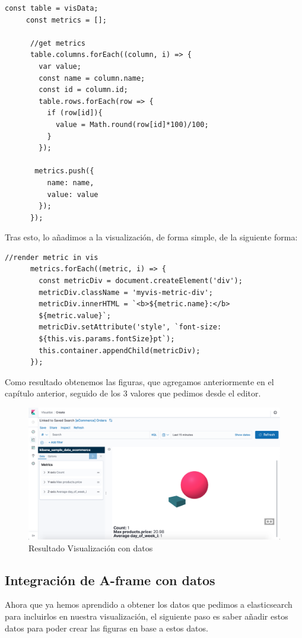 \documentclass[a4paper, 12pt]{book}
\begin{document}
\begin{lstlisting}[frame=single]
     const table = visData;
     const metrics = [];

      //get metrics
      table.columns.forEach((column, i) => {
        var value;
        const name = column.name;
        const id = column.id;
        table.rows.forEach(row => {
          if (row[id]){
            value = Math.round(row[id]*100)/100;
          }
        });

       metrics.push({
          name: name,
          value: value
        });
      });
\end{lstlisting}
Tras esto, lo añadimos a la visualización, de forma simple, de la siguiente forma:
\begin{lstlisting}[frame=single]
      //render metric in vis
      metrics.forEach((metric, i) => {
        const metricDiv = document.createElement('div');
        metricDiv.className = 'myvis-metric-div';
        metricDiv.innerHTML = `<b>${metric.name}:</b> 
        ${metric.value}`;
        metricDiv.setAttribute('style', `font-size: 
        ${this.vis.params.fontSize}pt`);
        this.container.appendChild(metricDiv);
      });
\end{lstlisting}
Como resultado obtenemos las figuras, que agregamos anteriormente en el capítulo anterior, seguido de los 3 valores que pedimos desde el editor.
\begin{figure}[H]
  \centering
  \includegraphics[width=16cm, keepaspectratio]{img/development/resultado-simple-data.png}
  \caption{Resultado Visualización con datos}
  \label{fig:simplewithdata}
\end{figure}


\subsection{Integración de A-frame con datos}
Ahora que ya hemos aprendido a obtener los datos que pedimos a elasticsearch para incluirlos en nuestra visualización, el siguiente paso es saber añadir estos datos para poder crear las figuras en base a estos datos.
\end{document}
